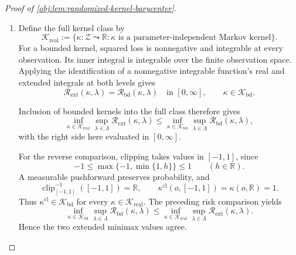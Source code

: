 \documentclass[11pt]{article}
\begin{document}
\begin{proof}[Proof of \cref{obj:lem:randomized-kernel-barycenter}]
\begin{enumerate}
Define the clipped kernel by the pushforward
\[
\kappa^{\mathrm{cl}}(o,\cdot)
:=
\kappa(o,\cdot)\circ\operatorname{clip}_{[-1,1]}^{-1},
\qquad o\in\mathcal Z,
\]
and define the extended risk for any real-valued Markov kernel by
\[
\mathcal R_{\mathrm{ext}}(\kappa,\lambda)
:=
\int_{\mathcal Z}\int_{\mathbb R}
\bigl(h-\vartheta(\lambda)\bigr)^2\,\kappa(o,dh)\,Q_\lambda(do)
\in[0,\infty],
\]
where both integrals are nonnegative extended integrals. Clipping is measurable.
The pushforward integration formula and monotonicity of these integrals give
\[
\begin{aligned}
\mathcal R_{\mathrm{ext}}(\kappa^{\mathrm{cl}},\lambda)
&=
\int_{\mathcal Z}\int_{\mathbb R}
\bigl(\operatorname{clip}_{[-1,1]}(h)-\vartheta(\lambda)\bigr)^2
\,\kappa(o,dh)\,Q_\lambda(do)\\
&\le \mathcal R_{\mathrm{ext}}(\kappa,\lambda).
\end{aligned}
\]
This comparison includes infinite original risks. %

\item Define the full kernel class by
\[
\mathcal K_{\mathrm{real}}
:=
\{\kappa:\mathcal Z\leadsto\mathbb R:
\kappa\text{ is a parameter-independent Markov kernel}\}.
\]
For a bounded kernel, squared loss is nonnegative and integrable at every
observation. Its inner integral is integrable over the finite observation
space. Applying the identification of a nonnegative integrable function's real
and extended integrals at both levels gives
\[
\mathcal R_{\mathrm{ext}}(\kappa,\lambda)
=\mathcal R_{\mathrm{bd}}(\kappa,\lambda)
\quad\text{in }[0,\infty],
\qquad \kappa\in\mathcal K_{\mathrm{bd}}.
\]

Inclusion of bounded kernels into the full class therefore gives
\[
\inf_{\kappa\in\mathcal K_{\mathrm{real}}}
\sup_{\lambda\in\Lambda}\mathcal R_{\mathrm{ext}}(\kappa,\lambda)
\le
\inf_{\kappa\in\mathcal K_{\mathrm{bd}}}
\sup_{\lambda\in\Lambda}\mathcal R_{\mathrm{bd}}(\kappa,\lambda),
\]
with the right side here evaluated in \([0,\infty]\).

For the reverse comparison, clipping takes values in \([-1,1]\), since
\[
-1\le \max\{-1,\min\{1,h\}\}\le1
\qquad(h\in\mathbb R).
\]
A measurable pushforward preserves probability, and
\[
\operatorname{clip}_{[-1,1]}^{-1}([-1,1])=\mathbb R,
\qquad
\kappa^{\mathrm{cl}}(o,[-1,1])=\kappa(o,\mathbb R)=1.
\]
Thus \(\kappa^{\mathrm{cl}}\in\mathcal K_{\mathrm{bd}}\) for every
\(\kappa\in\mathcal K_{\mathrm{real}}\). The preceding risk comparison yields
\[
\inf_{\kappa\in\mathcal K_{\mathrm{bd}}}
\sup_{\lambda\in\Lambda}\mathcal R_{\mathrm{bd}}(\kappa,\lambda)
\le
\inf_{\kappa\in\mathcal K_{\mathrm{real}}}
\sup_{\lambda\in\Lambda}\mathcal R_{\mathrm{ext}}(\kappa,\lambda).
\]
Hence the two extended minimax values agree.


\end{enumerate}
\end{proof}
\end{document}
